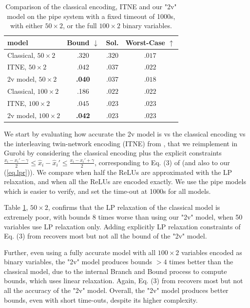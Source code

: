 \begin{table}[b!]
	\centering
	\begin{tabular}{||l|c|c|c||}\hline\hline
		model &        Bound $\downarrow$ &  Sol. &      Worst-Case $\uparrow$ \\\hline \hline
	Classical, $50 \times 2$ &    $.320$ &  $.320$ & $.017$ 
    \\\hline
	ITNE, $50 \times 2$ &    $.042$ &  $.037$ & $.022$
	\\ \hline
    2v model, $50 \times 2$ &    {\bf .040} &  $.037$ &  $.018$ 
    \\\hline \hline
    Classical, $100 \times 2$ &  .186  &  $.022$ & $.022$ 
    \\\hline
	ITNE, $100 \times 2$ &    $.045$ &  $.023$ & .023
    \\\hline
	2v model, $100 \times 2$&     {\bf .042} &  $.023$ &   .023 
    \\\hline \hline
	\end{tabular}
	\caption{Comparison of the classical encoding, ITNE and our "2v" model on the pipe system with a fixed timeout of 1000s, with either $50 \times 2$, 
    or the full $100 \times 2$ binary variables.}
    \label{table.classical}
\end{table}

We start by evaluating how accurate the 2v model is vs the classical encoding vs the interleaving twin-network encoding (ITNE) from \cite{lipshitz}, that we reimplement in Gurobi by considering the classical encoding plus the explicit constraints $\frac{x_i-x_i' - \gamma}{2} \leq \hat{x}_i-\hat{x}_i' \leq \frac{x_i-x_i' + \gamma}{2}$, corresponding to Eq. (3) of \cite{lipshitz} (and also to our (\ref{eq.lpr})). We compare when half the ReLUs are approximated with the LP relaxation, and when all the ReLUs are encoded exactly. We use the pipe models which is easier to verify, and set the time-out at 1000s for all models.


Table \ref{table.classical}, $50 \times 2$, confirms that the LP relaxation of the classical model is extremely poor, with bounds $8$ times worse than using our "2v" model, when 50 variables use LP relaxation only. Adding explicitly LP relaxation constraints of Eq. (3) from \cite{lipshitz} recovers most but not all the bound of the "2v" model.

Further, even using a fully accurate model with all $100 \times 2$ variables encoded as binary variables, the "2v" model produces bounds $>4$ times better than the classical model, due to the internal Branch and Bound process to compute bounds, which uses linear relaxation. Again, 
Eq. (3) from \cite{lipshitz} recovers most but not all the accuracy of the "2v" model.
Overall, the "2v" model produces better bounds, even with short time-outs, despite its higher complexity.

